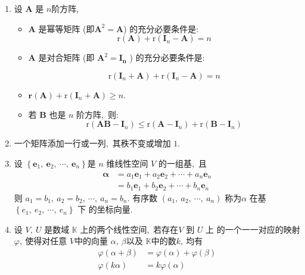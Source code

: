 \begin{enumerate}
		\item 设  $\boldsymbol{A} $ 是 $ n  $阶方阵,\ 
		\begin{itemize}
			\item $\boldsymbol{A} $ 是幂等矩阵 (即$  \boldsymbol{A}^{2}=\boldsymbol{A} $) 的充分必要条件是:
			$$
			\mathrm{r}(\boldsymbol{A})+\mathrm{r}\left(\boldsymbol{I}_{n}-\boldsymbol{A}\right)=n$$
			
			\item $\boldsymbol{A}$  是对合矩阵 (即  $\boldsymbol{A}^{2}=\boldsymbol{I_n} $ ) 的充分必要条件是:
			
			$$\mathrm{r}\left(\boldsymbol{I}_{n}+\boldsymbol{A}\right)+\mathrm{r}\left(\boldsymbol{I}_{n}-\boldsymbol{A}\right)=n$$
			
			\item$\mathbf{r}(\boldsymbol{A})+\mathrm{r}\left(\boldsymbol{I}_{n}+\boldsymbol{A}\right) \geqslant n .$
			\item 若 $ \boldsymbol{B}$  也是  $n$  阶方阵,\  则:
			$$\mathrm{r}\left(\boldsymbol{A} \boldsymbol{B}-\boldsymbol{I}_{n}\right) \leqslant \mathrm{r}\left(\boldsymbol{A}-\boldsymbol{I}_{n}\right)+\mathrm{r}\left(\boldsymbol{B}-\boldsymbol{I}_{n}\right)$$
		\end{itemize}
		\item 一个矩阵添加一行或一列,\  其秩不变或增加 $1.$
		\item 设  $\left\{\boldsymbol{e}_{1},\  \boldsymbol{e}_{2},\  \cdots,\  \boldsymbol{e}_{n}\right\}  $是  $n $ 维线性空间 $ V $ 的一组基,\  且
		$$\begin{aligned}
			\boldsymbol{\alpha} &=a_{1} \boldsymbol{e}_{1}+a_{2} \boldsymbol{e}_{2}+\cdots+a_{n} \boldsymbol{e}_{n} \\
			&=b_{1} \boldsymbol{e}_{1}+b_{2} \boldsymbol{e}_{2}+\cdots+b_{n} \boldsymbol{e}_{n}
		\end{aligned}$$
		则  $a_{1}=b_{1},\  a_{2}=b_{2},\  \cdots,\  a_{n}=b_{n} .$
		有序数  $\left(a_{1},\  a_{2},\  \cdots,\  a_{n}\right) $ 称为$  \alpha $ 在基$  \left\{e_{1},\  e_{2},\  \cdots,\  e_{n}\right\} $ 下 的坐标向量.
		\item 设 $ V,\  U $ 是数域  $\mathbb{K} $ 上的两个线性空间,\  若存在$  V$  到  $U$  上 的一个一一对应的映射  $\varphi ,\  $使得对任意  $V  $中的向量  $\alpha,\  \beta  $以及  $\mathbb{K}  $中的数$  k ,\  $均有
		$$
		\begin{aligned}
			\varphi(\alpha+\beta) &=\varphi(\alpha)+\varphi(\beta) \\
			\varphi(k \alpha) &=k \varphi(\alpha)
		\end{aligned}$$

\end{enumerate}
